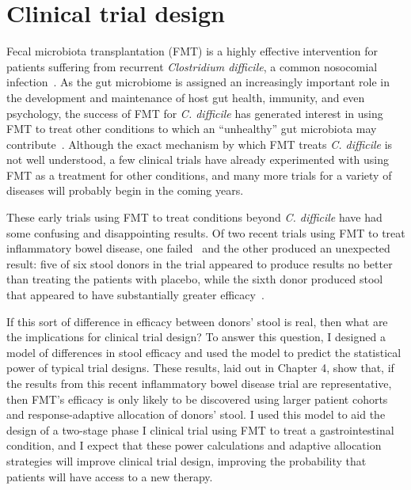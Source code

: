 \section{Clinical trial design}
Fecal microbiota transplantation (FMT) is a highly effective intervention for
patients suffering from recurrent \textit{Clostridium difficile}, a
common nosocomial infection~\cite{kassam_fecal_2013}. As the gut microbiome is
assigned an increasingly important role in the development and maintenance of host
gut health, immunity, and even psychology, the success of FMT for \textit{C.
difficile} has generated interest in using FMT to treat other conditions to
which an ``unhealthy'' gut microbiota may
contribute~\cite{smits_therapeutic_2013}. Although the exact mechanism by which FMT
treats \textit{C. difficile} is not well understood, a few clinical
trials have already experimented with using FMT as a treatment for other
conditions, and many more trials for a variety of diseases will probably begin
in the coming years.

These early trials using FMT to treat conditions beyond \textit{C. difficile}
have had some confusing and disappointing results. Of two recent
trials using FMT to treat inflammatory bowel disease, one
failed~\cite{rossen_findings_2015} and the other produced an unexpected
result: five of six stool donors in the trial appeared to produce results no
better than treating the patients with placebo, while the sixth donor produced
stool that appeared to have substantially greater efficacy~\cite{moayyedi_fecal_2015}.

If this sort of difference in efficacy between donors' stool is real, then
what are the implications for clinical trial design? 
To answer this question, I designed a model of differences in stool
efficacy and used the model to predict the statistical power of typical trial
designs. These results, laid out in Chapter 4, show that, if the results
from this recent inflammatory bowel disease trial are representative, then
FMT's efficacy is only likely to be discovered using larger patient cohorts
and response-adaptive allocation of donors' stool. I used this model
to aid the design of a two-stage phase I clinical trial using FMT to treat
a gastrointestinal condition, and I expect that these power calculations and
adaptive allocation strategies will improve clinical trial design, improving
the probability that patients will have access to a new therapy.

\begin{singlespace}


\end{singlespace}
